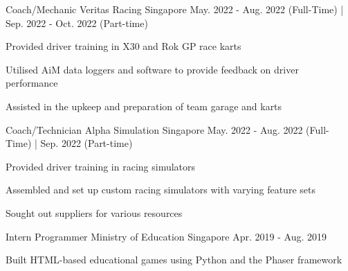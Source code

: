 

\begin{cventries}

  \cventry
    {Coach/Mechanic} %
    {Veritas Racing} %
    {Singapore} %
    {May. 2022 - Aug. 2022 (Full-Time) | Sep. 2022 - Oct. 2022 (Part-time)} %
    {
      \begin{cvitems} %
        \item {Provided driver training in X30 and Rok GP race karts}
        \item {Utilised AiM data loggers and software to provide feedback on driver performance}
        \item {Assisted in the upkeep and preparation of team garage and karts}
      \end{cvitems}
    }

  \cventry
    {Coach/Technician} %
    {Alpha Simulation} %
    {Singapore} %
    {May. 2022 - Aug. 2022 (Full-Time) | Sep. 2022 (Part-time)} %
    {
      \begin{cvitems} %
        \item {Provided driver training in racing simulators}
        \item {Assembled and set up custom racing simulators with varying feature sets}
        \item {Sought out suppliers for various resources}
      \end{cvitems}
    }

  \cventry
    {Intern Programmer} %
    {Ministry of Education} %
    {Singapore} %
    {Apr. 2019 - Aug. 2019} %
    {
      \begin{cvitems} %
        \item {Built HTML-based educational games using Python and the Phaser framework}
      \end{cvitems}
    }
\end{cventries}
